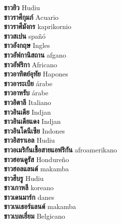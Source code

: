 \textbf{ ชาวยิว  } Hudiu \\
\textbf{ ชาวราศีกุมภ์  } Acuario \\
\textbf{ ชาวราศีมังกร  } kaprikornio \\
\textbf{ ชาวสเปน  } spañó \\
\textbf{ ชาวอังกฤษ  } Ingles \\
\textbf{ ชาวอัฟกานิสถาน  } afgano \\
\textbf{ ชาวอัฟริกา  } Africano \\
\textbf{ ชาวอาทิตย์อุทัย  } Hapones \\
\textbf{ ชาวอาระเบีย  } árabe \\
\textbf{ ชาวอาหรับ  } árabe \\
\textbf{ ชาวอิตาลี  } Italiano \\
\textbf{ ชาวอินเดีย  } Indjan \\
\textbf{ ชาวอินเดียแดง  } Indjan \\
\textbf{ ชาวอินโดนีเซีย  } Indones \\
\textbf{ ชาวอิสราเอล  } Hudiu \\
\textbf{ ชาวอเมริกันเชื้อสายแอฟริกัน  } afroamerikano \\
\textbf{ ชาวฮอนดูรัส  } Hondureño \\
\textbf{ ชาวฮอลแลนด์  } makamba \\
\textbf{ ชาวฮีบรู  } Hudiu \\
\textbf{ ชาวเกาหลี  } koreano \\
\textbf{ ชาวเดนมาร์ก  } danes \\
\textbf{ ชาวเนเธอร์แลนด์  } makamba \\
\textbf{ ชาวเบลเยี่ยม  } Belgicano \\
